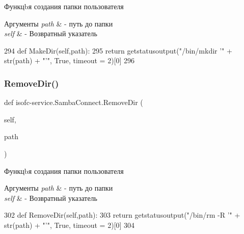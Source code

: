 Функцbя создания папки пользователя 


\begin{DoxyParams}{Аргументы}
{\em path} & -\/ путь до папки \\
\hline
{\em self} & -\/ Возвратный указатель \\
\hline
\end{DoxyParams}

\begin{DoxyCode}
294     \textcolor{keyword}{def }MakeDir(self,path):
295         \textcolor{keywordflow}{return} getstatusoutput(\textcolor{stringliteral}{"/bin/mkdir '"} + str(path) + \textcolor{stringliteral}{"'"}, \textcolor{keyword}{True}, timeout = 2)[0]
296 
\end{DoxyCode}
\mbox{\label{classisofc-service_1_1SambaConnect_a53b1038919225c543e2f432b3e53fb5b}} 
\subsubsection{\texorpdfstring{Remove\+Dir()}{RemoveDir()}}
{\footnotesize\ttfamily def isofc-\/service.\+Samba\+Connect.\+Remove\+Dir (\begin{DoxyParamCaption}\item[{}]{self,  }\item[{}]{path }\end{DoxyParamCaption})}



Функцbя создания папки пользователя 


\begin{DoxyParams}{Аргументы}
{\em path} & -\/ путь до папки \\
\hline
{\em self} & -\/ Возвратный указатель \\
\hline
\end{DoxyParams}

\begin{DoxyCode}
302     \textcolor{keyword}{def }RemoveDir(self,path):
303         \textcolor{keywordflow}{return} getstatusoutput(\textcolor{stringliteral}{"/bin/rm -R '"} + str(path) + \textcolor{stringliteral}{"'"}, \textcolor{keyword}{True}, timeout = 2)[0]
304 
\end{DoxyCode}
\mbox{\label{classisofc-service_1_1SambaConnect_a8e1ce795e1e813c874d32d9abce8179e}} 
